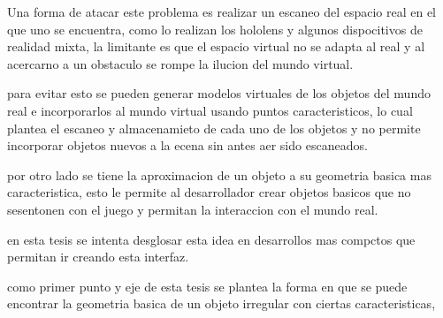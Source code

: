 Una forma de atacar este problema es realizar un escaneo del espacio real en el que uno se encuentra, como lo realizan los hololens y algunos dispocitivos de realidad mixta, la limitante es que el espacio virtual no se adapta al real y al acercarno a un obstaculo se rompe la ilucion del mundo virtual.


para evitar esto se pueden generar modelos virtuales de los objetos del mundo real e incorporarlos al mundo virtual usando puntos caracteristicos, lo cual plantea el escaneo y almacenamieto de cada uno de los objetos y no permite incorporar objetos nuevos a la ecena sin antes aer sido escaneados.


por otro lado se tiene la aproximacion de un objeto a su geometria basica mas caracteristica, esto le permite al desarrollador  crear objetos basicos que no sesentonen con el juego y permitan la interaccion con el mundo real.

en esta tesis se intenta desglosar esta idea en desarrollos mas compctos que permitan ir creando esta interfaz.

como primer punto y eje de esta tesis se plantea la forma en que se puede encontrar la geometria basica de un objeto irregular con ciertas caracteristicas, 



